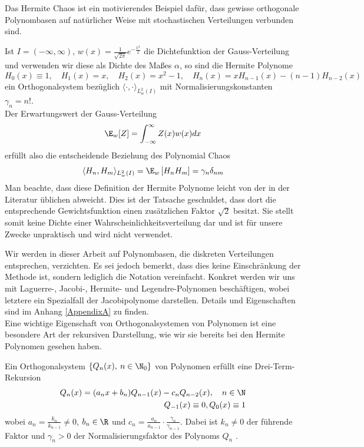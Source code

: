 Das Hermite Chaos ist ein motivierendes Beispiel dafür, dass gewisse orthogonale Polynombasen auf natürlicher Weise mit stochastischen Verteilungen verbunden sind.
\begin{mathbsp}
\label{bsp:hermitechaos}
Ist $I=(-\infty,\infty)$, $w(x)=\frac{1}{\sqrt{2\pi}}e^{-\frac{x^2}{2}}$ die Dichtefunktion der Gauss-Verteilung und verwenden wir diese als Dichte des Maßes $\alpha$, so sind die Hermite Polynome
\[H_0(x)\equiv 1,\quad H_1(x)=x,\quad H_2(x)=x^2-1,\quad H_n(x)=xH_{n-1}(x)-(n-1)H_{n-2}(x)\]
ein Orthogonalsystem bezüglich $\langle\cdot,\cdot\rangle_{L_w^2(I)}$ mit Normalisierungskonstanten $\gamma_n=n!$.\\
Der Erwartungswert der Gauss-Verteilung
\[\E_w[Z]= \int_{-\infty}^\infty Z(x)w(x)dx\] erfüllt also die entscheidende Beziehung des Polynomial Chaos
\[\langle H_n,H_m\rangle_{L_w^2(I)} =\E_w \left[H_nH_m\right]=\gamma_n\delta_{nm}\]
Man beachte, dass diese Definition der Hermite Polynome leicht von der in der Literatur üblichen abweicht. Dies ist der Tatsache geschuldet, dass dort die entsprechende Gewichtsfunktion einen zusätzlichen Faktor $\sqrt{2}$ besitzt. Sie stellt somit keine Dichte einer Wahrscheinlichkeitsverteilung dar und ist für unsere Zwecke unpraktisch und wird nicht verwendet. 
\end{mathbsp}
Wir werden in dieser Arbeit auf Polynombasen, die diskreten Verteilungen entsprechen, verzichten. Es sei jedoch bemerkt, dass dies keine Einschränkung der Methode ist, sondern lediglich die Notation vereinfacht. Konkret werden wir uns mit Laguerre-, Jacobi-, Hermite- und Legendre-Polynomen beschäftigen, wobei letztere ein Spezialfall der Jacobipolynome darstellen. Details und Eigenschaften sind im Anhang \ref{AppendixA} zu finden.\\[0.3cm]
Eine wichtige Eigenschaft von Orthogonalsystemen von Polynomen ist eine besondere Art der rekursiven Darstellung, wie wir sie bereits bei den Hermite Polynomen gesehen haben.
\begin{maththeorem}
\label{threetermexist}
Ein Orthogonalsystem $\left\lbrace Q_n(x),\: n\in\N_0\right\rbrace$ von Polynomen erfüllt eine Drei-Term-Rekursion
\begin{eqnarray}
Q_n(x)=(a_nx+b_n)Q_{n-1}(x)-c_nQ_{n-2}(x),\quad n\in\N\\
Q_{-1}(x)\equiv 0, Q_0(x)\equiv 1\nonumber
\end{eqnarray}
wobei $a_n=\frac{k_n}{k_{n-1}}\neq 0$, $b_n\in\R$ und $c_n=\frac{a_n}{a_{n-1}}\cdot \frac{\gamma_n}{\gamma_{n-1}}$.
Dabei ist $k_n\neq 0$ der führende Faktor und $\gamma_n>0$ der Normalisierungsfaktor des Polynoms $Q_n$ . 
\end{maththeorem}
